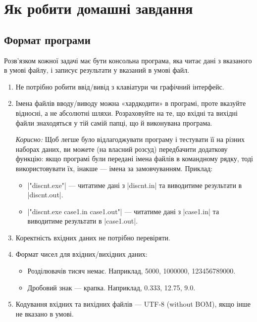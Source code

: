 \documentclass[12pt,a4paper]{article}
\begin{document}
\section*{Як робити домашні завдання}


\subsection*{Формат програми}

Розв'язком кожної задачі має бути консольна програма, яка читає дані з вказаного в умові файлу, і записує результати у вказаний в умові файл.

\begin{enumerate}
    \item Не потрібно робити ввід/вивід з клавіатури чи графічний інтерфейс.
    \item Імена файлів вводу/виводу можна «хардкодити» в програмі, проте вказуйте відносні, а не абсолютні шляхи. Розраховуйте на те, що вхідні та вихідні файли знаходяться у тій самій папці, що й виконувана програма.

        \vspace{0.5em}
        \emph{Корисно:} Щоб легше було відлагоджувати програму і тестувати її на різних наборах даних, ви можете (на власний розсуд) передбачити додаткову функцію: якщо програмі були передані імена файлів в командному рядку, тоді використовувати їх, інакше --- імена за замовчуванням. Приклад:
        \begin{itemize}
            \item |"discnt.exe"| --- читатиме дані з |discnt.in| та виводитиме результати в |discnt.out|.
            \item |"discnt.exe case1.in case1.out"| --- читатиме дані з |case1.in| та виводитиме результати в |case1.out|.
        \end{itemize}

    \item Коректність вхідних даних не потрібно перевіряти.
    \item Формат чисел для вхідних/вихідних даних:
        \begin{itemize}
            \item Розділювачів тисяч немає. Наприклад, 5000, 1000000, 123456789000.
            \item Дробовий знак --- крапка. Наприклад, 0.333, 12.75, 9.0.
        \end{itemize}

    \item Кодування вхідних та вихідних файлів --- UTF-8 (without BOM), якщо інше не вказано в умові.
\end{enumerate}
\end{document}

